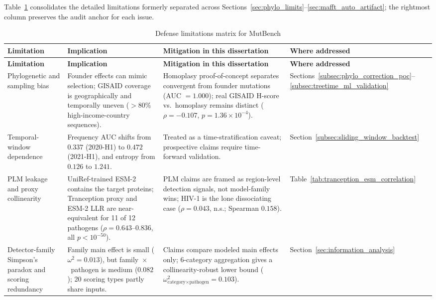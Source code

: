 Table~\ref{tab:limitations_summary} consolidates the detailed limitations formerly separated across Sections~\ref{sec:phylo_limits}--\ref{sec:mafft_auto_artifact}; the rightmost column preserves the audit anchor for each issue.

{\small
\begin{longtable}{p{}p{}p{}p{}}
\caption{Defense limitations matrix for MutBench}
\label{tab:limitations_summary}\\
\toprule
\textbf{Limitation} & \textbf{Implication} & \textbf{Mitigation in this dissertation} & \textbf{Where addressed} \\
\midrule
\endfirsthead
\toprule
\textbf{Limitation} & \textbf{Implication} & \textbf{Mitigation in this dissertation} & \textbf{Where addressed} \\
\midrule
\endhead
Phylogenetic and sampling bias & Founder effects can mimic selection; GISAID coverage is geographically and temporally uneven ($> 80\%$ high-income-country sequences). & Homoplasy proof-of-concept separates convergent from founder mutations (AUC $= 1.000$); real GISAID H-score vs.\ homoplasy remains distinct ($\rho = -0.107$, $p = 1.36 \times 10^{-4}$). & Sections~\ref{subsec:phylo_correction_poc}--\ref{subsec:treetime_ml_validation} \\
Temporal-window dependence & Frequency AUC shifts from $0.337$ (2020-H1) to $0.472$ (2021-H1), and entropy from $0.126$ to $1.241$. & Treated as a time-stratification caveat; prospective claims require time-forward validation. & Section~\ref{subsec:sliding_window_backtest} \\
PLM leakage and proxy collinearity & UniRef-trained ESM-2 contains the target proteins; Tranception proxy and ESM-2 LLR are near-equivalent for 11 of 12 pathogens ($\rho = 0.643$--$0.836$, all $p < 10^{-50}$). & PLM claims are framed as region-level detection signals, not model-family wins; HIV-1 is the lone dissociating case ($\rho = 0.043$, n.s.; Spearman $0.158$). & Table~\ref{tab:tranception_esm_correlation} \\
Detector-family Simpson's paradox and scoring redundancy & Family main effect is small ($\omega^2 = 0.013$), but family~$\times$~pathogen is medium ($0.082$); 20 scoring types partly share inputs. & Claims compare modeled main effects only; 6-category aggregation gives a collinearity-robust lower bound ($\omega^2_{\text{category} \times \text{pathogen}} = 0.103$). & Section~\ref{sec:information_analysis} \\

\end{longtable}}
